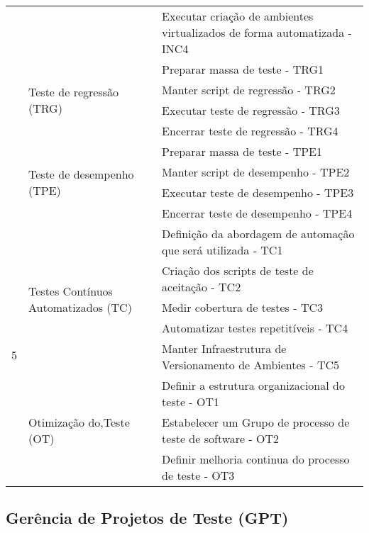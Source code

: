 \begin{table}[H]
{\begin{tabular}{|p{45mm}|p{76mm}|p{100mm}|}
    \cline{3-3}
        & & Executar criação de ambientes virtualizados  de forma automatizada - INC4 \\ 
    \cline{2-3}
        & \multirow{4}{*}{Teste de regressão (TRG)}& 
        Preparar massa de teste - TRG1\\ 
    \cline{3-3}
        & & Manter script de regressão - TRG2\\ 
    \cline{3-3}
        & & Executar teste de regressão - TRG3\\ 
    \cline{3-3}
        & & Encerrar teste de regressão - TRG4\\ 
    \cline{2-3}
        & \multirow{4}{*}{Teste de desempenho (TPE)}& 
        Preparar massa de teste - TPE1\\ 
    \cline{3-3}
        & & Manter script de desempenho - TPE2\\ 
    \cline{3-3}
        & & Executar teste de desempenho - TPE3\\ 
    \cline{3-3}
        & & Encerrar teste de desempenho - TPE4\\ 
    \hline
        \multirow{8}{*}{5}&
        \multirow{5}{*}{Testes Contínuos Automatizados (TC)}&
        Definição da abordagem de automação que será utilizada - TC1\\ 
    \cline{3-3}
        & & Criação dos scripts de teste de aceitação - TC2\\
    \cline{3-3}
        & & Medir cobertura de testes - TC3\\ 
    \cline{3-3}
        & & Automatizar testes repetitíveis - TC4\\ 
    \cline{3-3}
        & & Manter Infraestrutura de Versionamento de Ambientes - TC5\\ 
    \cline{2-3}
        & \multirow{3}{*}{Otimização do,Teste (OT)}& 
        Definir a estrutura organizacional do teste - OT1\\
    \cline{3-3}
        & & Estabelecer um Grupo de processo de teste de software - OT2\\ 
    \cline{3-3}
        & & Definir melhoria continua do processo de teste - OT3\\ 
    \hline
    \end{tabular}
}
\end{table}

\subsection{Gerência de Projetos de Teste (GPT)}
\label{sec:gerenciadeprojetosdeteste}


